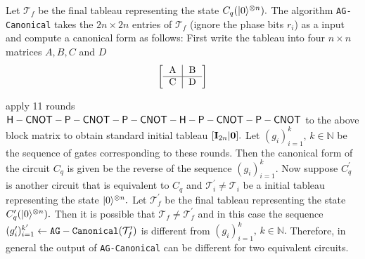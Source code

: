 Let $\mathcal{T}_f$ be the final tableau representing the state $C_q({\lvert}0\rangle^{\otimes n}).$ The algorithm  {\tt AG-Canonical}  takes the $2n\times 2n$ entries of $\mathcal{T}_f$ (ignore the phase bits $r_i$) as a input and compute a canonical form as follows: First write the tableau into four $n\times n$ matrices $A, B, C$ and $D$  
\[
\left[
\begin{tabular}
[c]{c|c}
A&B \\\hline
C&D
\end{tabular}
\right]
\]




apply 11 rounds  ${\sf H}-{\sf CNOT}-{\sf P}-{\sf CNOT}-{\sf P}-{\sf CNOT}-{\sf H}-{\sf P}-{\sf CNOT}-{\sf P}-{\sf CNOT}$ to the above block matrix to obtain standard initial tableau $[{\bf I}_{2n}|{\bf 0}].$ Let $(g_i)_{i=1}^k,\, k\in\mathbb{N}$ be the sequence of gates corresponding to these rounds. Then the canonical form of the circuit $C_q$ is given be the reverse of the sequence $(g_i)_{i=1}^k.$ Now suppose $C_q^\prime$  is another circuit that is equivalent to 
$C_q$ and $\mathcal{T}_i^\prime \neq \mathcal{T}_i$ be a initial tableau representing the state ${\lvert}0\rangle^{\otimes n}.$ Let $\mathcal{T}_f^\prime$ be the final tableau representing the state $C_q^\prime({\lvert}0\rangle^{\otimes n}).$ Then it is possible that $\mathcal{T}_f\neq \mathcal{T}_f^\prime$ and in this case the sequence $(g_i^\prime )_{i=1}^{k^\prime} \leftarrow {\tt AG-Canonical}(\mathcal{T}_f^\prime)$ is different from $(g_i)_{i=1}^k,\, k\in\mathbb{N}.$ Therefore, in general the output of {\tt AG-Canonical}  can be different for two equivalent circuits. 


